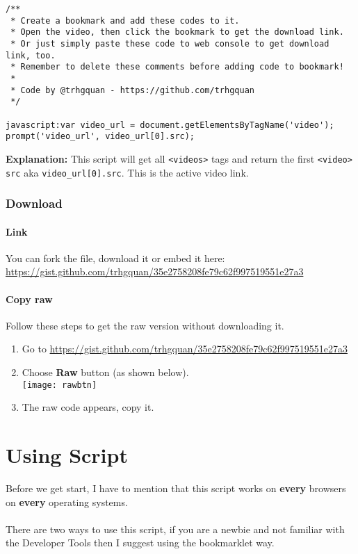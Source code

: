 \documentclass{article}
\begin{document}
\begin{verbatim}
/**
 * Create a bookmark and add these codes to it.
 * Open the video, then click the bookmark to get the download link.
 * Or just simply paste these code to web console to get download link, too.
 * Remember to delete these comments before adding code to bookmark!
 *
 * Code by @trhgquan - https://github.com/trhgquan
 */

javascript:var video_url = document.getElementsByTagName('video');
prompt('video_url', video_url[0].src);
\end{verbatim}
\textbf{Explanation:} This script will get all \verb|<videos>| tags and return the first \verb|<video>| \verb|src| aka \verb|video_url[0].src|. This is the active video link.

\section{Download}
\subsection{Link}
You can fork the file, download it or embed it here:
\\
\href{https://gist.github.com/trhgquan/35e2758208fe79c62f997519551e27a3}{https://gist.github.com/trhgquan/35e2758208fe79c62f997519551e27a3}

\subsection{Copy raw}\label{copyraw}
Follow these steps to get the raw version without downloading it.
\begin{enumerate}
\item Go to  \href{https://gist.github.com/trhgquan/35e2758208fe79c62f997519551e27a3}{https://gist.github.com/trhgquan/35e2758208fe79c62f997519551e27a3}\cite{scriptlink}
\item Choose \textbf{Raw} button (as shown below).
\\
\texttt{[image: rawbtn]}
\item The raw code appears, copy it.
\end{enumerate}

\part{Using Script}
Before we get start, I have to mention that this script works on \textbf{every} browsers on \textbf{every} operating systems.
\\\\
There are two ways to use this script, if you are a newbie and not familiar with the Developer Tools then I suggest using the bookmarklet way.
\end{document}
